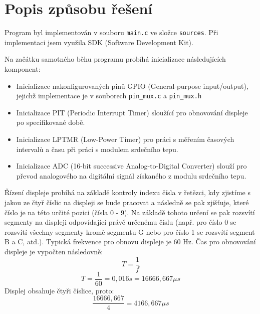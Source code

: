 \documentclass[a4paper, 11pt]{article}
\begin{document}
\section{Popis způsobu řešení}
Program byl implementován v souboru \verb|main.c| ve složce \verb|sources|. Při implementaci jsem využila SDK (Software Development Kit). 

Na začátku samotného běhu programu probíhá inicializace následujících komponent:
\begin{itemize}
    \item Inicializace nakonfigurovaných pinů GPIO (General-purpose input/output), jejichž implementace je v souborech  \verb|pin_mux.c| a \verb|pin_mux.h|
    \item Inicializace PIT (Periodic Interrupt Timer) sloužící pro obnovování displeje po specifikované době.
    \item Inicializace LPTMR (Low-Power Timer) pro práci s měřením časových intervalů a času při práci s modulem srdečního tepu.
    \item Inicializace ADC (16-bit successive Analog-to-Digital Converter) slouží pro převod analogového na digitální signál získaného z modulu srdečního tepu.
\end{itemize}

Řízení displeje probíhá na základě kontroly indexu čísla v řetězci, kdy zjistíme s jakou ze čtyř číslic na displeji se bude pracovat a následně se pak zjišťuje, které číslo je na této určité pozici (čísla 0 - 9). Na základě tohoto určení se pak rozsvítí segmenty na displeji odpovídající právě určenému číslu (např. pro číslo 0 se rozsvítí všechny segmenty kromě segmentu G nebo pro číslo 1 se rozsvítí segment B a C, atd.). Typická frekvence pro obnovu displeje je 60 Hz. Čas pro obnovování displeje je vypočten následovně:\\
$$T = \frac{1}{f}$$
$$T = \frac{1}{60} = 0,016 s = 16666,667 \mu s$$
Displej obsahuje čtyři číslice, proto:\\
$$\frac{16666,667}{4} = 4166,667 \mu s$$
\end{document}
